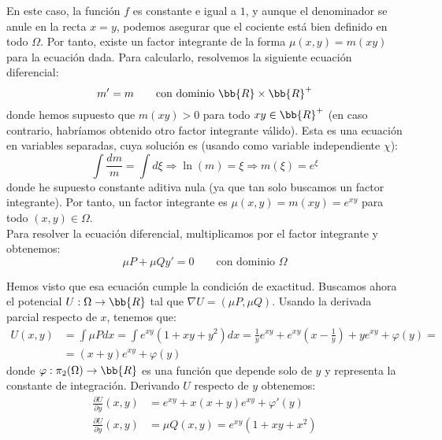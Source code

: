 \begin{ejercicio}
    En este caso, la función $f$ es constante e igual a $1$, y aunque el denominador se anule en la recta $x=y$, podemos asegurar que el cociente está bien definido en todo $\Omega$. Por tanto, existe un factor integrante de la forma $\mu(x,y)=m(xy)$ para la ecuación dada. Para calcularlo, resolvemos la siguiente ecuación diferencial:
    \begin{equation*}
        m'=m \qquad \text{con dominio }\bb{R}\times \bb{R}^+
    \end{equation*}
    donde hemos supuesto que $m(xy)>0$ para todo $xy\in\bb{R}^+$ (en caso contrario, habríamos obtenido otro factor integrante válido). Esta es una ecuación en variables separadas, cuya solución es (usando como variable independiente $\chi$):
    \begin{equation*}
        \int \frac{dm}{m} = \int d\xi 
        \Longrightarrow \ln (m) = \xi
        \Longrightarrow m(\xi) = e^{\xi}
    \end{equation*}
    donde he supuesto constante aditiva nula (ya que tan solo buscamos un factor integrante). Por tanto, un factor integrante es $\mu(x,y)=m(xy)=e^{xy}$ para todo $(x,y)\in\Omega$.\\

    Para resolver la ecuación diferencial, multiplicamos por el factor integrante y obtenemos:
    \begin{equation*}
        \mu P + \mu Q y' = 0 \qquad \text{con dominio }\Omega
    \end{equation*}

    Hemos visto que esa ecuación cumple la condición de exactitud. Buscamos ahora el potencial $U:\Omega\to\bb{R}$ tal que $\nabla U=(\mu P,\mu Q)$. Usando la derivada parcial respecto de $x$, tenemos que:
    \begin{align*}
        U(x,y)&=\int \mu P dx = \int e^{xy}(1+xy+y^2) dx = \frac{1}{y}e^{xy} + e^{xy}\left(x-\frac{1}{y}\right) + ye^{xy} + \varphi(y)=\\
        &= (x+y)e^{xy} + \varphi(y)
    \end{align*}
    donde $\varphi:\pi_2(\Omega)\to\bb{R}$ es una función que depende solo de $y$ y representa la constante de integración. Derivando $U$ respecto de $y$ obtenemos:
    \begin{align*}
        \frac{\partial U}{\partial y}(x,y)&=e^{xy} + x(x+y)e^{xy} + \varphi'(y)\\
        \frac{\partial U}{\partial y}(x,y)&=\mu Q(x,y)=e^{xy}(1+xy+x^2)
    \end{align*}


\end{ejercicio}
